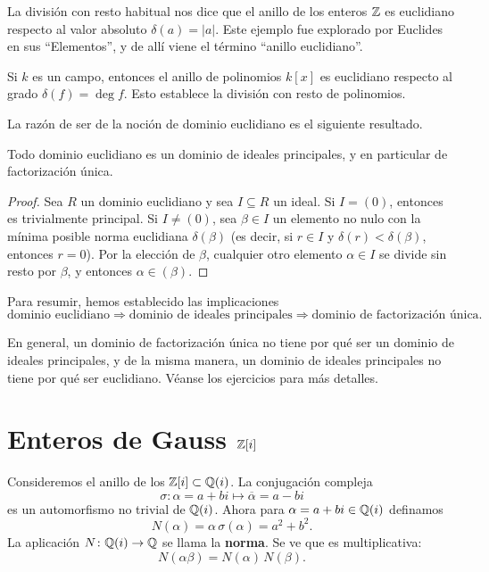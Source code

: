 \begin{ejemplo}
  La división con resto habitual nos dice que el anillo de los enteros $\mathbb{Z}$ es
  euclidiano respecto al valor absoluto $\delta (a) = |a|$. Este ejemplo fue
  explorado por Euclides en sus ``Elementos'', y de allí viene el término
  ``anillo euclidiano''.

  Si $k$ es un campo, entonces el anillo de polinomios $k [x]$ es euclidiano
  respecto al grado $\delta (f) = \deg f$. Esto establece la división con resto
  de polinomios.
\end{ejemplo}

La razón de ser de la noción de dominio euclidiano es el siguiente resultado.

\begin{teorema}
  Todo dominio euclidiano es un dominio de ideales principales, y en particular
  de factorización única.

\begin{proof}
  Sea $R$ un dominio euclidiano y sea $I \subseteq R$ un ideal. Si $I = (0)$,
  entonces es trivialmente principal. Si $I \ne (0)$, sea $\beta\in I$ un
  elemento no nulo con la mínima posible norma euclidiana $\delta (\beta)$
  (es decir, si $r \in I$ y $\delta (r) < \delta (\beta)$, entonces $r = 0$).
  Por la elección de $\beta$, cualquier otro elemento $\alpha \in I$ se divide
  sin resto por $\beta$, y entonces $\alpha \in (\beta)$.
\end{proof}
\end{teorema}

Para resumir, hemos establecido las implicaciones
\[ \text{dominio euclidiano} \Longrightarrow
   \text{dominio de ideales principales} \Longrightarrow
   \text{dominio de factorización única}. \]

En general, un dominio de factorización única no tiene por qué ser un
dominio de ideales principales, y de la misma manera, un dominio de ideales
principales no tiene por qué ser euclidiano. Véanse los ejercicios para
más detalles.


\section{Enteros de Gauss \texorpdfstring{$\mathbb{Z} [i]$}{ℤ[i]}}

Consideremos el anillo de los 
$\mathbb{Z} [i] \subset \mathbb{Q} (i)$. La conjugación compleja
$$\sigma\colon \alpha = a + bi \mapsto \overline{\alpha} = a - bi$$
es un automorfismo no trivial de $\mathbb{Q} (i)$. Ahora para
$\alpha = a + bi \in \mathbb{Q} (i)$ definamos
$$N (\alpha) = \alpha \, \sigma (\alpha) = a^2 + b^2.$$
La aplicación $N\colon \mathbb{Q} (i) \to \mathbb{Q}$ se llama la \textbf{norma}. Se ve que es
multiplicativa:
$$N (\alpha\beta) = N (\alpha) \, N (\beta).$$

